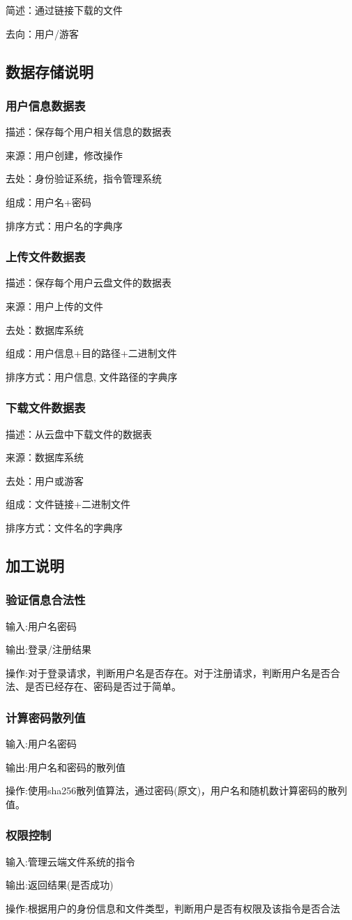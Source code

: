 简述：通过链接下载的文件

去向：用户/游客

\subsection{数据存储说明}
\subsubsection{用户信息数据表}
描述：保存每个用户相关信息的数据表

来源：用户创建，修改操作

去处：身份验证系统，指令管理系统

组成：用户名+密码

排序方式：用户名的字典序

\subsubsection{上传文件数据表}
描述：保存每个用户云盘文件的数据表

来源：用户上传的文件

去处：数据库系统

组成：用户信息+目的路径+二进制文件

排序方式：用户信息, 文件路径的字典序

\subsubsection{下载文件数据表}
描述：从云盘中下载文件的数据表

来源：数据库系统

去处：用户或游客

组成：文件链接+二进制文件

排序方式：文件名的字典序

\subsection{加工说明}
\subsubsection{验证信息合法性}
输入:用户名密码

输出:登录/注册结果

操作:对于登录请求，判断用户名是否存在。对于注册请求，判断用户名是否合法、是否已经存在、密码是否过于简单。

\subsubsection{计算密码散列值}
输入:用户名密码

输出:用户名和密码的散列值

操作:使用sha256散列值算法，通过密码(原文)，用户名和随机数计算密码的散列值。

\subsubsection{权限控制}
输入:管理云端文件系统的指令

输出:返回结果(是否成功)

操作:根据用户的身份信息和文件类型，判断用户是否有权限及该指令是否合法